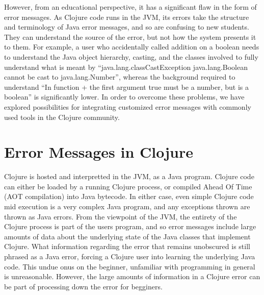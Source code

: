 \documentclass[12pt]{article}
\begin{document}
However, from an educational perspective, it has a significant flaw in the form of error messages.
As Clojure code runs in the JVM, its errors take the structure and terminology of Java error messages,
and so are confusing to new students. They can understand the source of the error,
but not how the system presents it to them.
For example, a user who accidentally called addition on a boolean needs
 to understand the Java object hierarchy, casting,
 and the classes involved to fully understand what is meant by
 ``java.lang.classCastException java.lang.Boolean cannot be cast to java.lang.Number'',
whereas the background required to understand ``In function + the first argument true must be a number, but is a boolean''
 is significantly lower.
 In order to overcome these problems,
 we have explored possibilities for integrating customized error messages with commonly used tools in the Clojure community.

\section{Error Messages in Clojure}
Clojure is hosted and interpretted in the JVM, as a Java program.
Clojure code can either be loaded by a running Clojure process, or
compiled Ahead Of Time (AOT compilation) into Java bytecode. In either case,
even simple Clojure code mid execution is a very complex Java program,
and any exceptions thrown are thrown as Java errors.
From the viewpoint of the JVM, the entirety of the Clojure process is
part of the users program, and so error messages include large amounts
of data about the underlying state of the Java classes that implement Clojure.
What information regarding the error that remains unobscured is still
phrased as a Java error, forcing a Clojure user into learning
the underlying Java code. This undue onus on the beginner,
unfamiliar with programming in general is unreasonable.
However, the large amounts of information in a Clojure error
can be part of processing down the error for begginers.
\end{document}
